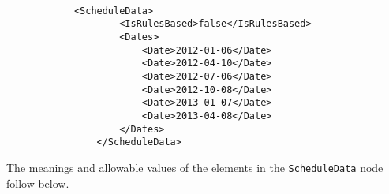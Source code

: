 {\footnotesize
\begin{lstlisting}[caption=ScheduleData with IsRulesBased: false, label=lst:schedule_data_false]

      		<ScheduleData>
                    <IsRulesBased>false</IsRulesBased>
                    <Dates>
                        <Date>2012-01-06</Date>
                        <Date>2012-04-10</Date>
                        <Date>2012-07-06</Date>
                        <Date>2012-10-08</Date>
                        <Date>2013-01-07</Date>
                        <Date>2013-04-08</Date>
                    </Dates>
                </ScheduleData>

\end{lstlisting}
}

The meanings and allowable values of the elements in the \lstinline!ScheduleData! node follow below.

